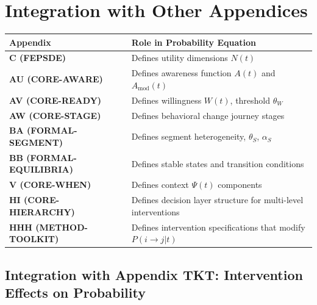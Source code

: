 \documentclass[11pt, a4paper]{article}
\begin{document}

\section{Integration with Other Appendices}

\begin{center}
\begin{tabular}{|l|p{5cm}|}
\hline
\textbf{Appendix} & \textbf{Role in Probability Equation} \\
\hline
\textbf{C (FEPSDE)} & Defines utility dimensions $N(t)$ \\
\hline
\textbf{AU (CORE-AWARE)} & Defines awareness function $A(t)$ and $A_{\text{mod}}(t)$ \\
\hline
\textbf{AV (CORE-READY)} & Defines willingness $W(t)$, threshold $\theta_W$ \\
\hline
\textbf{AW (CORE-STAGE)} & Defines behavioral change journey stages \\
\hline
\textbf{BA (FORMAL-SEGMENT)} & Defines segment heterogeneity, $\theta_S$, $\alpha_S$ \\
\hline
\textbf{BB (FORMAL-EQUILIBRIA)} & Defines stable states and transition conditions \\
\hline
\textbf{V (CORE-WHEN)} & Defines context $\Psi(t)$ components \\
\hline
\textbf{HI (CORE-HIERARCHY)} & Defines decision layer structure for multi-level interventions \\
\hline
\textbf{HHH (METHOD-TOOLKIT)} & Defines intervention specifications that modify $P(i \to j | t)$ \\
\hline
\end{tabular}
\end{center}

\subsection{Integration with Appendix TKT: Intervention Effects on Probability}
\label{sec:bc-hhh-integration}
\end{document}
